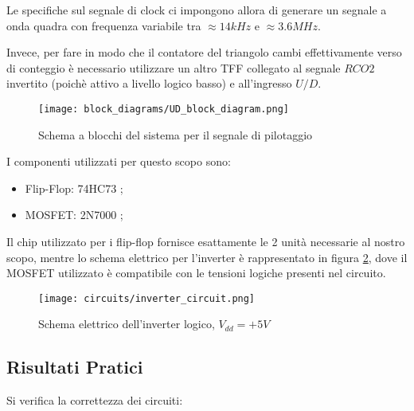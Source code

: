 Le specifiche sul segnale di clock ci impongono allora di generare un segnale a onda quadra
con frequenza variabile tra $\approx14kHz$ e $\approx3.6MHz$.

Invece, per fare in modo che il contatore del triangolo cambi effettivamente verso di conteggio
è necessario utilizzare un altro TFF collegato al segnale $RCO2$ invertito (poichè attivo a
livello logico basso) e all'ingresso $U/D$.
\medskip

\begin{figure}[ht]
    \centering
    \texttt{[image: block\_diagrams/UD\_block\_diagram.png]}
    \caption{Schema a blocchi del sistema per il segnale di pilotaggio}
    \label{UD_block_diagram}
\end{figure}

I componenti utilizzati per questo scopo sono:

\begin{itemize}
    \item Flip-Flop: 74HC73 \cite{74hc73};
    \item MOSFET: 2N7000 \cite{2n7000};
\end{itemize}

Il chip utilizzato per i flip-flop fornisce esattamente le 2 unità necessarie al nostro
scopo, mentre lo schema elettrico per l'inverter è rappresentato in figura
\ref{inverter_circuit}, dove il MOSFET utilizzato è compatibile con le tensioni logiche
presenti nel circuito.
\medskip

\begin{figure}[ht]
    \centering
    \texttt{[image: circuits/inverter\_circuit.png]}
    \caption{Schema elettrico dell'inverter logico, $V_{dd}=+5V$}
    \label{inverter_circuit}
\end{figure}


\subsection*{Risultati Pratici}


Si verifica la correttezza dei circuiti:
\medskip

